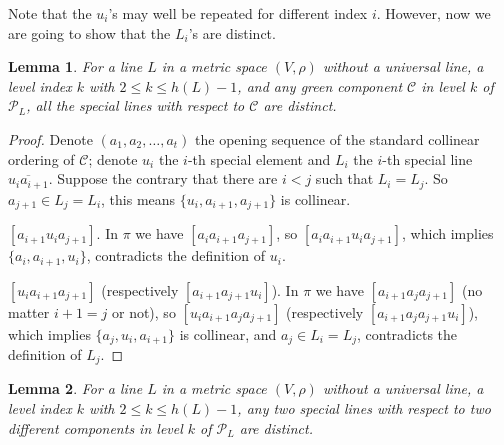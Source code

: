 \documentclass[12pt]{article}
\newcommand{\ov}{\overline}
\newtheorem{lem}{Lemma}
\begin{document}
Note that the $u_i$'s may well be repeated for different index $i$.
However, now we are going to show that the $L_i$'s are distinct.

\begin{lem}\label{lem.distinct_lines_samecpt}
For a line $L$ in a metric space $(V, \rho)$ without a universal line,
a level index $k$ with $2 \le k \le h(L)-1$,
and any green component $\mathcal{C}$ in level $k$ of $\mathcal{P}_L$,
all the special lines with respect to $\mathcal{C}$ are distinct. 
\end{lem}

\begin{proof}
Denote $(a_1, a_2, \dots, a_t)$ the opening sequence of 
the standard collinear ordering of $\mathcal{C}$;
denote $u_i$ the $i$-th special element and $L_i$ the $i$-th special line $\ov{u_i a_{i+1}}$.
Suppose the contrary that there are $i<j$ such that $L_i = L_j$. So $a_{j+1} \in L_j = L_i$,
this means $\{u_i, a_{i+1}, a_{j+1}\}$ is collinear.

 $[a_{i+1}u_i a_{j+1}]$. In $\pi$ we have $[a_ia_{i+1}a_{j+1}]$,
so $[a_ia_{i+1}u_i a_{j+1}]$, which implies $\{a_i, a_{i+1}, u_i\}$, 
contradicts the definition of $u_i$.

 $[u_i a_{i+1} a_{j+1}]$ (respectively $[a_{i+1} a_{j+1} u_i]$). 
In $\pi$ we have $[a_{i+1} a_j a_{j+1}]$ 
(no matter $i+1 = j$ or not), so $[u_i  a_{i+1} a_j a_{j+1} ] $ (respectively $[a_{i+1} a_j a_{j+1} u_i]$),
which implies $\{a_j, u_i, a_{i+1}\}$ is collinear, 
and $a_j \in L_i = L_j$, contradicts the definition of $L_j$.
\end{proof}

\begin{lem}\label{lem.distinct_lines_diffcpt}
For a line $L$ in a metric space $(V, \rho)$ without a universal line,
a level index $k$ with $2 \le k \le h(L)-1$, any two special lines
with respect to two different components in level $k$ of $\mathcal{P}_L$ are distinct. 
\end{lem}
\end{document}
